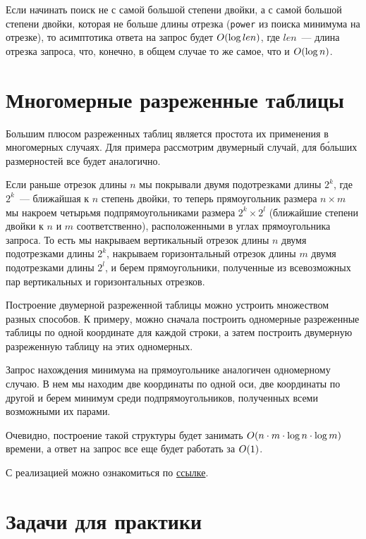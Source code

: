 \begin{observation}
    Если начинать поиск не с самой большой степени двойки, а с самой большой степени двойки, которая не больше длины отрезка (\verb+power+ из поиска минимума на отрезке), то асимптотика ответа на запрос будет $O(\log len)$, где $len$~--- длина отрезка запроса, что, конечно, в общем случае то же самое, что и $O(\log n)$.
\end{observation}



\section{Многомерные разреженные таблицы}

Большим плюсом разреженных таблиц является простота их применения в многомерных случаях. Для примера рассмотрим двумерный случай, для б\'{о}льших размерностей все будет аналогично.

Если раньше отрезок длины $n$ мы покрывали двумя подотрезками длины $2^k$, где $2^k$~--- ближайшая к $n$ степень двойки, то теперь прямоугольник размера $n \times m$ мы накроем четырьмя подпрямоугольниками размера $2^k \times 2^l$ (ближайшие степени двойки к $n$ и $m$ соответственно), расположенными в углах прямоугольника запроса. То есть мы накрываем вертикальный отрезок длины $n$ двумя подотрезками длины $2^k$, накрываем горизонтальный отрезок длины $m$ двумя подотрезками длины $2^l$, и берем прямоугольники, полученные из всевозможных пар вертикальных и горизонтальных отрезков.

Построение двумерной разреженной таблицы можно устроить множеством разных способов. К примеру, можно сначала построить одномерные разреженные таблицы по одной координате для каждой строки, а затем построить двумерную разреженную таблицу на этих одномерных.

Запрос нахождения минимума на прямоугольнике аналогичен одномерному случаю. В нем мы находим две координаты по одной оси, две координаты по другой и берем минимум среди подпрямоугольников, полученных всеми возможными их парами.

Очевидно, построение такой структуры будет занимать $O(n \cdot m \cdot \log n \cdot \log m)$ времени, а ответ на запрос все еще будет работать за $O(1)$.


С реализацией можно ознакомиться по \href{https://pastebin.com/1b7HWCPB}{ссылке}.


\section{Задачи для практики}

